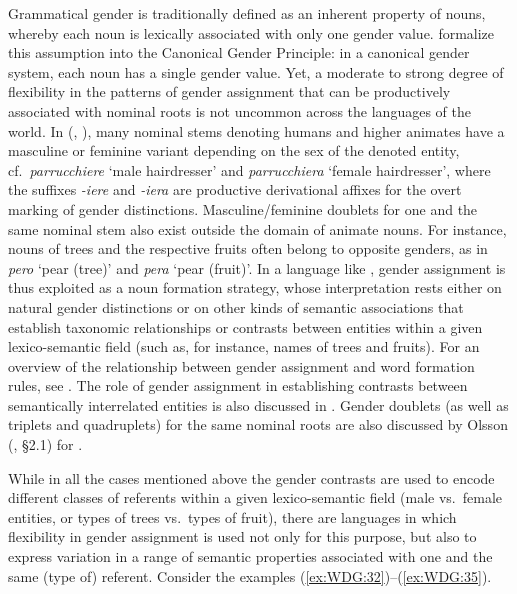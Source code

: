 \documentclass[output=collectionpaper]{langsci/langscibook}
\begin{document}
Grammatical gender is traditionally defined as an inherent property of nouns, whereby each noun is lexically associated with only one gender value. \cite[9]{Corbett2016} formalize this assumption into the Canonical Gender Principle: in a canonical gender system, each noun has a single gender value. Yet, a moderate to strong degree of flexibility in the patterns of gender assignment that can be productively associated with nominal roots is not uncommon across the languages of the world. In  (, ), many nominal stems denoting humans and higher animates have a masculine or feminine variant depending on the sex of the denoted entity, cf.\ \textit{parrucchiere} `male hairdresser' and \textit{parrucchiera} `female hairdresser', where the suffixes \textit{-iere} and \textit{-iera} are productive derivational affixes for the overt marking of gender distinctions.
%
Masculine/feminine doublets for one and the same nominal stem also exist outside the domain of animate nouns. For instance, nouns of trees and the respective fruits often belong to opposite genders, as in \textit{pero} `pear (tree)' and \textit{pera} `pear (fruit)'. In a language like , gender assignment is thus exploited as a noun formation strategy, whose interpretation rests either on natural gender distinctions or on other kinds of semantic associations that establish taxonomic relationships or contrasts between entities within a given lexico-semantic field (such as, for instance, names of trees and fruits). For an overview of the relationship between gender assignment and word formation rules, see \cite{Contini-Morava2013}. The role of gender assignment in establishing contrasts between semantically interrelated entities is also discussed in . Gender doublets (as well as triplets and quadruplets) for the same nominal roots are also discussed by Olsson (, \S 2.1) for .

While in all the cases mentioned above the gender contrasts are used to encode different classes of referents within a given lexico-semantic field (male vs.\ female entities, or types of trees vs.\ types of fruit), there are languages in which flexibility in gender assignment is used not only for this purpose, but also to express variation in a range of semantic properties associated with one and the same (type of) referent. Consider the examples (\ref{ex:WDG:32})--(\ref{ex:WDG:35}).
\end{document}
